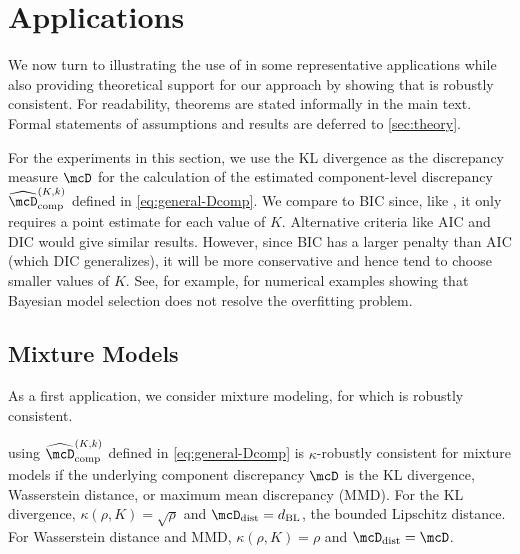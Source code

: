 \section{Applications}
\label{sec:experiments}

We now turn to illustrating the use of \methodname in some representative applications while 
also providing theoretical support for our approach by showing that \methodname is robustly consistent.  
For readability, theorems are stated informally in the main text.
Formal statements of assumptions and results are deferred to \cref{sec:theory}. 

For the experiments in this section, we use the KL divergence as the discrepancy measure $\mcD$ for the 
calculation of the estimated component-level discrepancy $\compDiscEst^{(K,k)}$ defined in \cref{eq:general-Dcomp}.
We compare to BIC since, like \methodname, it only requires a point estimate for each value of $K$.
Alternative criteria like AIC and DIC would give similar results.
However, since BIC has a larger penalty than AIC (which DIC generalizes), it will be more conservative and hence tend to choose smaller values of $K$.
See, for example, \citet{Miller:2019,Xue:2024,Cai:2021} for numerical examples showing that Bayesian 
model selection does not resolve the overfitting problem.


\subsection{Mixture Models}

As a first application, we consider mixture modeling, for which \methodname is robustly consistent. 
\begin{theorem} \label{thm:mixture-model-robust-consistency}
\methodname using $\compDiscEst^{(K,k)}$ defined in \cref{eq:general-Dcomp} is $\kappa$-robustly consistent for mixture models if the underlying component discrepancy $\mcD$ is the KL divergence, Wasserstein distance, or maximum mean discrepancy (MMD). 
For the KL divergence, $\kappa(\rho, K) = \sqrt{\rho}$ and $\distDisc = d_\mathrm{BL}$, the bounded Lipschitz distance. 
For Wasserstein distance and MMD, $\kappa(\rho, K) = \rho$ and $\distDisc = \mcD$. 
\end{theorem}

